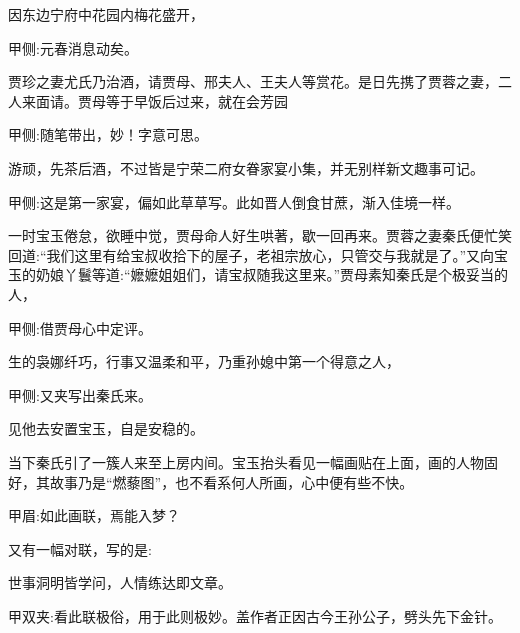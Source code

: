 \begin{parag}
\end{parag}


\begin{parag}
    因东边宁府中花园内梅花盛开，\begin{note}甲侧:元春消息动矣。\end{note}贾珍之妻尤氏乃治酒，请贾母、邢夫人、王夫人等赏花。是日先携了贾蓉之妻，二人来面请。贾母等于早饭后过来，就在会芳园\begin{note}甲侧:随笔带出，妙！字意可思。\end{note}游顽，先茶后酒，不过皆是宁荣二府女眷家宴小集，并无别样新文趣事可记。\begin{note}甲侧:这是第一家宴，偏如此草草写。此如晋人倒食甘蔗，渐入佳境一样。\end{note}
\end{parag}


\begin{parag}
    一时宝玉倦怠，欲睡中觉，贾母命人好生哄著，歇一回再来。贾蓉之妻秦氏便忙笑回道:“我们这里有给宝叔收拾下的屋子，老祖宗放心，只管交与我就是了。”又向宝玉的奶娘丫鬟等道:“嬷嬷姐姐们，请宝叔随我这里来。”贾母素知秦氏是个极妥当的人，\begin{note}甲侧:借贾母心中定评。\end{note}生的袅娜纤巧，行事又温柔和平，乃重孙媳中第一个得意之人，\begin{note}甲侧:又夹写出秦氏来。\end{note}见他去安置宝玉，自是安稳的。
\end{parag}


\begin{parag}
    当下秦氏引了一簇人来至上房内间。宝玉抬头看见一幅画贴在上面，画的人物固好，其故事乃是“燃藜图”，也不看系何人所画，心中便有些不快。\begin{note}甲眉:如此画联，焉能入梦？\end{note}又有一幅对联，写的是:
\end{parag}


\begin{poem}
    \begin{pl}世事洞明皆学问，人情练达即文章。\end{pl}
    \begin{note}甲双夹:看此联极俗，用于此则极妙。盖作者正因古今王孙公子，劈头先下金针。\end{note}
\end{poem}


